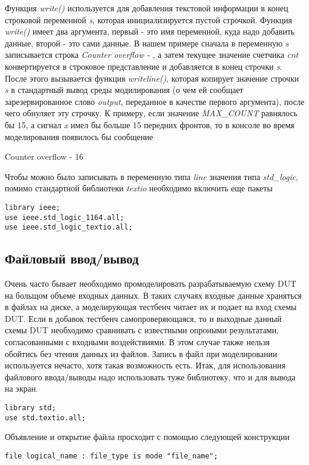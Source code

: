 Функция \emph{write()} используется для добавления текстовой информации в конец строковой переменной \emph{s}, которая инициализируется пустой строчкой. Функция \emph{write()} имеет два аргумента, первый - это имя переменной, куда надо добавить данные, второй - это сами данные. В нашем примере сначала в переменную \emph{s} записывается строка \emph{Counter overflow - }, а затем текущее значение счетчика \emph{cnt} конвертируется в строковое представление и добавляется в конец строчки \emph{s}. После этого вызывается функция \emph{writeline()}, которая копирует значение строчки \emph{s} в стандартный вывод среды модилирования (о чем ей сообщает зарезервированное слово \emph{output}, переданное в качестве первого аргумента), после чего обнуляет эту строчку. К примеру, если значение \emph{MAX\_COUNT} равнялось бы 15, а сигнал \emph{x} имел бы больше 15 передних фронтов, то в консоле во время моделирования появилось бы сообщение

Counter overflow - 16

Чтобы можно было записывать в переменную типа \emph{line} значения типа \emph{std\_logic}, помимо стандартной библиотеки \emph{textio} необходимо включить еще пакеты
\begin{lstlisting}
library ieee;
use ieee.std_logic_1164.all;
use ieee.std_logic_textio.all;
\end{lstlisting}

\subsection{Файловый ввод/вывод}

Очень часто бывает необходимо промоделировать разрабатываемую схему DUT на больщом объеме входных данных. В таких случаях входные данные храняться в файлах на диске, а моделирующая тестбенч читает их и подает на вход схемы DUT. Если в добавок тестбенч самопроверяющаяся, то и выходные данный схемы DUT необходимо сравнивать с известными опроными результатами, согласованными с входными воздействиями. В этом случае также нельзя обойтись без чтения данных из файлов. Запись в файл при моделировании используется нечасто, хотя такая возможность есть. Итак, для использования файлового ввода/выводы надо использовать туже библиотеку, что и для вывода на экран.

\begin{lstlisting}
library std;
use std.textio.all;
\end{lstlisting}

Объявление и открытие файла просходит с помощью следующей конструкции
\begin{lstlisting}
file logical_name : file_type is mode "file_name";
\end{lstlisting}

